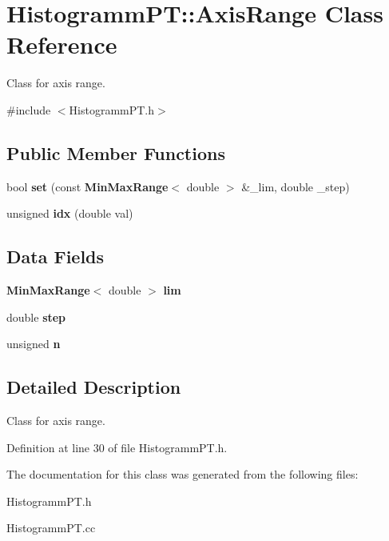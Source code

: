\section{Histogramm\-P\-T\-:\-:Axis\-Range Class Reference}
\label{classHistogrammPT_1_1AxisRange}


Class for axis range.  




{\ttfamily \#include $<$Histogramm\-P\-T.\-h$>$}

\subsection*{Public Member Functions}
\begin{DoxyCompactItemize}
\item 
bool {\bfseries set} (const {\bf Min\-Max\-Range}$<$ double $>$ \&\-\_\-lim, double \-\_\-step)\label{classHistogrammPT_1_1AxisRange_a2502c6bc3acea4407d8c40f98b8ebbbc}

\item 
unsigned {\bfseries idx} (double val)\label{classHistogrammPT_1_1AxisRange_a9704c7046100d7dde3f6d68e201142f2}

\end{DoxyCompactItemize}
\subsection*{Data Fields}
\begin{DoxyCompactItemize}
\item 
{\bf Min\-Max\-Range}$<$ double $>$ {\bfseries lim}\label{classHistogrammPT_1_1AxisRange_af69eb3b0a5c1444e10943256c2c44484}

\item 
double {\bfseries step}\label{classHistogrammPT_1_1AxisRange_a5ce62b557ca23603c32cc5ad5b5bc52e}

\item 
unsigned {\bfseries n}\label{classHistogrammPT_1_1AxisRange_a145ae4ea2354e5ff0881a69672c23e2a}

\end{DoxyCompactItemize}


\subsection{Detailed Description}
Class for axis range. 

Definition at line 30 of file Histogramm\-P\-T.\-h.



The documentation for this class was generated from the following files\-:\begin{DoxyCompactItemize}
\item 
Histogramm\-P\-T.\-h\item 
Histogramm\-P\-T.\-cc\end{DoxyCompactItemize}
